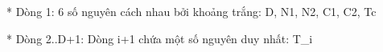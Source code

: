 * Dòng 1: 6 số nguyên cách nhau bởi khoảng trắng: D, N1, N2, C1, C2, Tc   

    * Dòng 2..D+1: Dòng i+1 chứa một số nguyên duy nhất: T\_i